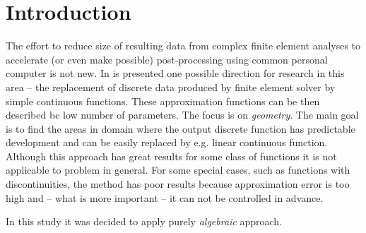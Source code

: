 \section{Introduction}
\label{sec:introduction}


The effort to reduce size of resulting data from complex finite element analyses to accelerate (or even make possible) post-processing using common personal computer is not new.
In \cite{Benes2016} is presented one possible direction for research in this area -- the replacement of discrete data produced by finite element solver by simple continuous functions. These approximation functions can be then described be low number of parameters. The focus is on \textit{geometry}. The main goal is to find the areas in domain where the output discrete function has predictable development and can be easily replaced by e.g. linear continuous function. Although this approach has great results for some class of functions it is not applicable to problem in general. For some special cases, such as functions with discontinuities, the method has poor results because approximation error is too high and -- what is more important -- it can not be controlled in advance.

In this study it was decided to apply purely \textit{algebraic} approach. 



